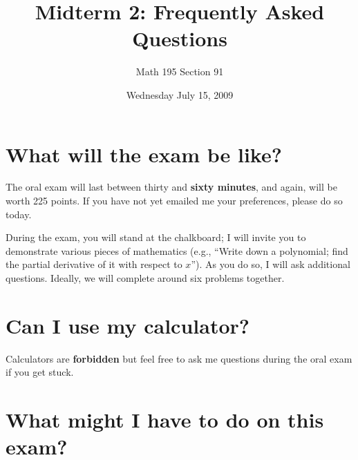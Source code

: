 \documentclass[12pt]{article}
\title{Midterm 2: Frequently Asked Questions}
\author{Math 195 Section 91}
\date{Wednesday July 15, 2009}
\begin{document}
\maketitle

\section*{What will the exam be like?}

The oral exam will last between thirty and \textbf{sixty minutes}, and
again, will be worth 225 points.  If you have not yet emailed me your preferences, please do so today.

During the exam, you will stand at the chalkboard; I will invite you
to demonstrate various pieces of mathematics (e.g., ``Write down a
polynomial; find the partial derivative of it with respect to $x$'').
As you do so, I will ask additional questions.  Ideally, we will
complete around six problems together.

\section*{Can I use my calculator?}

Calculators are \textbf{forbidden} but feel free to ask me questions
during the oral exam if you get stuck.

\section*{What might I have to do on this exam?}
\end{document}
